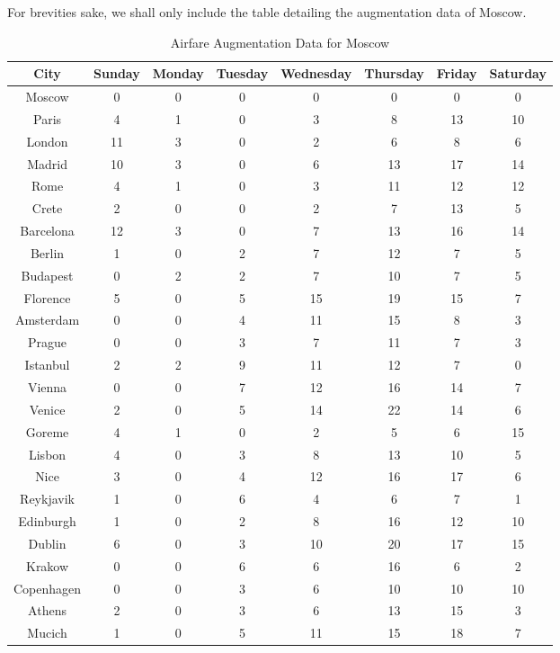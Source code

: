 \documentclass[12pt]{article}
\begin{document}
For brevities sake, we shall only include the table detailing the augmentation data of Moscow.

\begin{table}[h]
\caption{Airfare Augmentation Data for Moscow}
\centering
\vspace{1mm}
\begin{tabular}{c|c|c|c|c|c|c|c}
\hline
\rule{0pt}{2ex} City & Sunday & Monday & Tuesday & Wednesday & Thursday & Friday & Saturday \\
\hline
\rule{0pt}{2ex}Moscow & 0 & 0 & 0 & 0 & 0 & 0 & 0 \\
Paris & 4 & 1 & 0 & 3 & 8 & 13 & 10 \\
London & 11 & 3 & 0 & 2 & 6 & 8 & 6 \\
Madrid & 10 & 3 & 0 & 6 & 13 & 17 & 14 \\
Rome & 4 & 1 & 0 & 3 & 11 & 12 & 12 \\
Crete & 2 & 0 & 0 & 2 & 7 & 13 & 5 \\
Barcelona & 12 & 3 & 0 & 7 & 13 & 16 & 14 \\
Berlin & 1 & 0 & 2 & 7 & 12 & 7 & 5 \\
Budapest & 0 & 2 & 2 & 7 & 10 & 7 & 5 \\
Florence & 5 & 0 & 5 & 15 & 19 & 15 & 7 \\
Amsterdam & 0 & 0 & 4 & 11 & 15 & 8 & 3 \\
Prague & 0 & 0 & 3 & 7 & 11 & 7 & 3 \\
Istanbul & 2 & 2 & 9 & 11 & 12 & 7 & 0 \\
Vienna & 0 & 0 & 7 & 12 & 16 & 14 & 7 \\
Venice & 2 & 0 & 5 & 14 & 22 & 14 & 6 \\
Goreme & 4 & 1 & 0 & 2 & 5 & 6 & 15 \\
Lisbon & 4 & 0 & 3 & 8 & 13 & 10 & 5 \\
Nice & 3 & 0 & 4 & 12 & 16 & 17 & 6 \\
Reykjavik & 1 & 0 & 6 & 4 & 6 & 7 & 1 \\
Edinburgh & 1 & 0 & 2 & 8 & 16 & 12 & 10 \\
Dublin & 6 & 0 & 3 & 10 & 20 & 17 & 15 \\
Krakow & 0 & 0 & 6 & 6 & 16 & 6 & 2 \\
Copenhagen & 0 & 0 & 3 & 6 & 10 & 10 & 10 \\
Athens & 2 & 0 & 3 & 6 & 13 & 15 & 3 \\
Mucich & 1 & 0 & 5 & 11 & 15 & 18 & 7 \\
\end{tabular}
\end{table}
\end{document}
